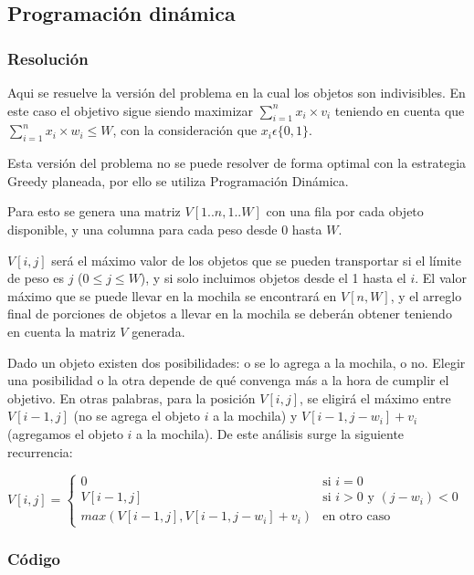 \documentclass[a4paper,10pt,spanish]{article}
\begin{document}
	\subsection{Programaci\'on din\'amica}
	\subsubsection{Resoluci\'on}
	Aqui se resuelve la versi\'on del problema en la cual los objetos son indivisibles. En este caso el objetivo sigue siendo maximizar $\sum_{i=1}^n x_i\times v_i$ teniendo en cuenta que $\sum_{i=1}^n x_i\times w_i \leq W$, con la consideraci\'on que $x_i \epsilon \{0,1\}$.
	
	Esta versi\'on del problema no se puede resolver de forma optimal con la estrategia Greedy planeada, por ello se utiliza Programaci\'on Din\'amica.
	
	Para esto se genera una matriz $V[1..n,1..W]$ con una fila por cada objeto disponible, y una columna para cada peso desde $0$ hasta $W$.
	
	$V[i,j]$ ser\'a el m\'aximo valor de los objetos que se pueden transportar si el l\'imite de peso es $j$ ($0\leq j\leq W$), y si solo incluimos objetos desde el 1 hasta el $i$. El valor m\'aximo que se puede llevar en la mochila se encontrar\'a en $V[n,W]$, y el arreglo final de porciones de objetos a llevar en la mochila se deber\'an obtener teniendo en cuenta la matriz $V$ generada.
	
	Dado un objeto existen dos posibilidades: o se lo agrega a la mochila, o no. Elegir una posibilidad o la otra depende de qu\'e convenga m\'as a la hora de cumplir el objetivo. En otras palabras, para la posici\'on $V[i,j]$, se eligir\'a el m\'aximo entre $V[i-1,j]$ (no se agrega el objeto $i$ a la mochila) y $V[i-1,j-w_i]+v_i$ (agregamos el objeto $i$ a la mochila). De este an\'alisis surge la siguiente recurrencia:

\vspace{5mm}
\begin{math}
V[i,j] =
\left\{
	\begin{array}{ll}
		0  & \mbox{si } i = 0 \\
		V[i-1,j]  & \mbox{si } i > 0 \mbox{ y } (j - w_i) < 0 \\
		max(V[i-1,j], V[i-1,j-w_i]+v_i) & \mbox{en otro caso}
	\end{array}
\right.
\end{math}
	
	\subsubsection{C\'odigo}
	
\end{document}
